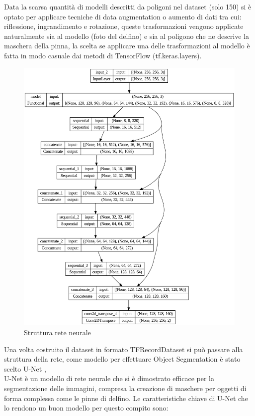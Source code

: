 \documentclass[a4paper,12pt]{report}
\begin{document}
      Data la scarsa quantità di modelli descritti da poligoni nel dataset (solo 150)
      si è optato per applicare tecniche di data augmentation o aumento di dati tra cui: riflessione, ingrandimento e rotazione,
      queste trasformazioni vengono applicate naturalmente sia al modello (foto del delfino) 
      e sia al poligono che ne descrive la maschera 
      della pinna, la scelta se applicare una delle trasformazioni al modello è fatta in modo 
      casuale dai metodi di TensorFlow (tf.keras.layers).
    
      \begin{figure}[H]
        \centering
        \begin{minipage}{0.8\textwidth}
          \centering
          \includegraphics[width=\textwidth]{assets/images/methods/deep/network/network.png}   
          \caption{Struttura rete neurale}
        \end{minipage}
      \end{figure}
      Una volta costruito il dataset in formato TFRecordDataset si può passare
      alla struttura della rete, come modello per effettuare Object Segmentation
      è stato scelto U-Net \cite{ronneberger2015u},
      \\ 
      U-Net è un modello di rete neurale che si è dimostrato efficace per la segmentazione delle immagini,
      compresa la creazione di maschere per oggetti di forma complessa come le pinne di delfino.
      \newpage
      Le caratteristiche chiave di U-Net che lo rendono un buon modello per questo compito sono:
\end{document}
